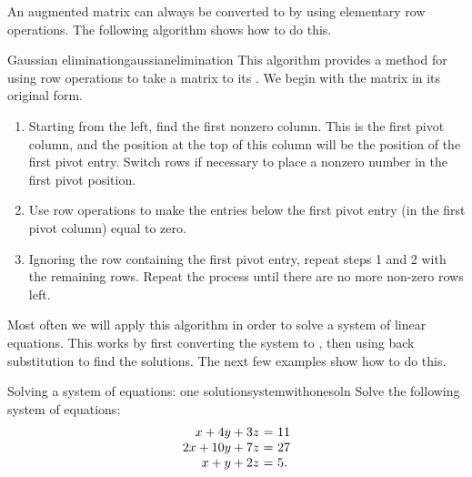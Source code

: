 An augmented matrix can always be converted to {\ef} by using
elementary row operations. The following algorithm shows how to do
this.

\begin{algorithm}{Gaussian elimination}{gaussianelimination}
  This algorithm provides a method for using row operations to take a
  matrix to its {\ef} .
  We begin with the matrix in its original form.

  \begin{enumerate}
  \item Starting from the left, find the first nonzero column. This is
    the first pivot column, and the position at the top of this column
    will be the position of the first pivot entry. Switch rows if
    necessary to place a nonzero number in the first pivot position.

  \item Use row operations to make the entries below the first pivot
    entry (in the first pivot column) equal to zero.

  \item Ignoring the row containing the first pivot entry, repeat
    steps 1 and 2 with the remaining rows.  Repeat the process until
    there are no more non-zero rows left.

  \end{enumerate}
\end{algorithm}

Most often we will apply this algorithm in order to solve a system of
linear equations. This works by first converting the system to {\ef},
then using back substitution to find the solutions. The next few
examples show how to do this.

\begin{example}{Solving a system of equations: one solution}{systemwithonesoln}
  Solve the following system of equations:
  \begin{equation*}
    \begin{array}{r@{~}c@{~}l}
      x+4y+3z &=& 11\\
      2x+10y+7z &=& 27\\
      x+y+2z &=& 5.
    \end{array}
  \end{equation*}
\end{example}

